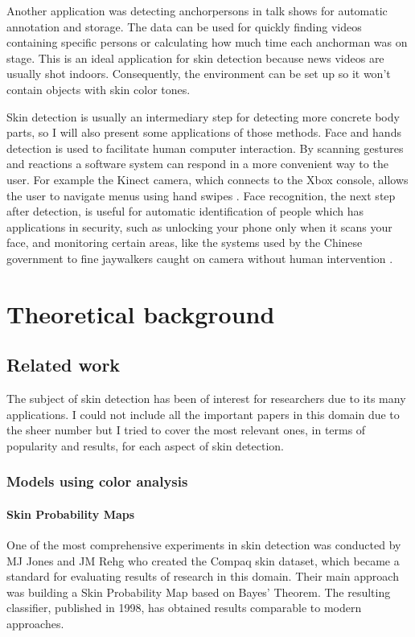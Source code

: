 \documentclass[12pt]{report}
\begin{document}
	Another application was detecting anchorpersons in talk shows \cite{anchor_person_detection} for automatic annotation and storage. The data can be used for quickly finding videos containing specific persons or calculating how much time each anchorman was on stage. This is an ideal application for skin detection because news videos are usually shot indoors. Consequently, the environment can be set up so it won't contain objects with skin color tones.
	
	Skin detection is usually an intermediary step for detecting more concrete body parts, so I will also present some applications of those methods. Face and hands detection is used to facilitate human computer interaction. By scanning gestures and reactions a software system can respond in a more convenient way to the user. For example the Kinect camera, which connects to the Xbox console,
	allows the user to navigate menus using hand swipes \cite{kinect_control}. Face recognition, the next step after detection, is useful for automatic identification of people \cite{detecting_faces_a_survey} which has applications in security, such as unlocking your phone only when it scans your face, and monitoring certain areas, like the systems used by the Chinese government to fine jaywalkers caught on camera without human intervention \cite{jaywalkers_china}.
	
	\chapter{Theoretical background}
	
	\section{Related work}
	The subject of skin detection has been of interest for researchers due to its many applications. I could not include all the important papers in this domain due to the sheer number but I tried to cover the most relevant ones, in terms of popularity and results, for each aspect of skin detection.
	
	\subsection{Models using color analysis}
	\subsubsection{Skin Probability Maps}
	One of the most comprehensive experiments in skin detection was conducted by MJ Jones and JM Rehg\cite{compaq} who created the Compaq skin dataset, which became a standard for evaluating results of research in this domain. Their main approach was building a Skin Probability Map based on Bayes' Theorem. The resulting classifier, published in 1998, has obtained results comparable to modern approaches.
	
\end{document}
